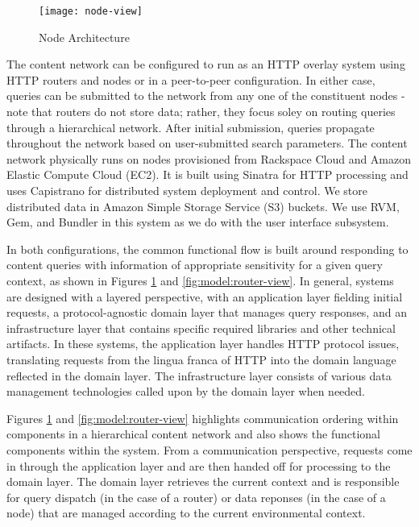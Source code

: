 \begin{figure}[!t]
\centering
\texttt{[image: node-view]}
\caption{Node Architecture}
\label{fig:model:node-view}
\end{figure}

The content network can be configured to run as an HTTP overlay system using HTTP routers and nodes or in a peer-to-peer configuration.  In either case, queries can be submitted to the network from any one of the constituent nodes - note that routers do not store data; rather, they focus soley on routing queries through a hierarchical network.  After initial submission, queries propagate throughout the network based on user-submitted search parameters.  The content network physically runs on nodes provisioned from Rackspace Cloud and Amazon Elastic Compute Cloud (EC2).  It is built using Sinatra for HTTP processing and uses Capistrano for distributed system deployment and control.  We store distributed data in Amazon Simple Storage Service (S3) buckets.  We use RVM, Gem, and Bundler in this system as we do with the user interface subsystem.

In both configurations, the common functional flow is built around responding to content queries with information of appropriate sensitivity for a given query context, as shown in Figures \ref{fig:model:node-view} and \ref{fig:model:router-view}.  In general, systems are designed with a layered perspective, with an application layer fielding initial requests, a protocol-agnostic domain layer that manages query responses, and an infrastructure layer that contains specific required libraries and other technical artifacts.  In these systems, the application layer handles HTTP protocol issues, translating requests from the lingua franca of HTTP into the domain language reflected in the domain layer.  The infrastructure layer consists of various data management technologies called upon by the domain layer when needed.

Figures \ref{fig:model:node-view} and \ref{fig:model:router-view} highlights communication ordering within components in a hierarchical content network and also shows the functional components within the system.  From a communication perspective, requests come in through the application layer and are then handed off for processing to the domain layer.  The domain layer retrieves the current context and is responsible for query dispatch (in the case of a router) or data reponses (in the case of a node) that are managed according to the current environmental context.

